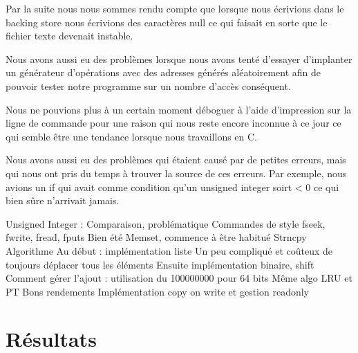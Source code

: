 \documentclass{article}
\begin{document}
Par la suite nous nous sommes rendu compte que lorsque nous écrivions dans le backing store nous écrivions des caractères null ce qui faisait en sorte que le fichier texte devenait instable. 
\par
Nous avons aussi eu des problèmes lorsque nous avons tenté d'essayer d'implanter un générateur d'opérations avec des adresses générés aléatoirement afin de pouvoir tester notre programme sur un nombre d'accès conséquent. 
\par
Nous ne pouvions plus à un certain moment déboguer à l'aide d'impression sur la ligne de commande pour une raison qui nous reste encore inconnue à ce jour ce qui semble être une tendance lorsque nous travaillons en C. 
\par
Nous avons aussi  eu des problèmes qui étaient causé par de petites erreurs, mais qui nous ont pris du temps à trouver la source de ces erreurs. Par exemple, nous avions un if qui avait comme condition qu'un unsigned integer soirt < 0 ce qui bien sûre n'arrivait jamais.
\par
Unsigned Integer : Comparaison, problématique
Commandes de style fseek, fwrite, fread, fputs
Bien été
Memset, commence à être habitué
Strncpy
Algorithme
Au début : implémentation liste 
Un peu compliqué  et  coûteux de toujours déplacer tous les éléments
Ensuite implémentation binaire, shift
Comment gérer l’ajout : utilisation du 100000000 pour 64 bits 
Même algo LRU et PT
Bons rendements
Implémentation copy on write et gestion readonly

\section{Résultats}
\end{document}
